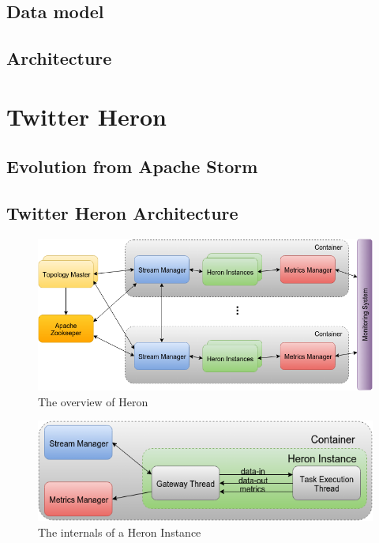 \documentclass[conference]{IEEEtran}
\begin{document}
\lipsum[2-3]


\subsection{Data model}

\lipsum[2-4]

\subsection{Architecture}

\lipsum[2-4]

\cite{StormTwitter}

\section{Twitter Heron}
\label{sec:TwitterHeron}

\lipsum[2-4]


\subsection{Evolution from Apache Storm}
\label{sec:EvolutionFromApacheStorm}

\lipsum[2-4]


\subsection{Twitter Heron Architecture}
\label{sec:TwitterHeronArchitecture}

\lipsum[2-4]


\begin{figure}[!tp]
    \centering
    \includegraphics[scale=0.45]{figures/HeronOverview}
    \caption{The overview of Heron}
    \label{fig:HeronOverview}
\end{figure}

\begin{figure}[htp]
    \centering
    \includegraphics[scale=0.45]{figures/HeronInstance}
    \caption{The internals of a Heron Instance}
    \label{fig:HeronInstance}
\end{figure}
\end{document}
